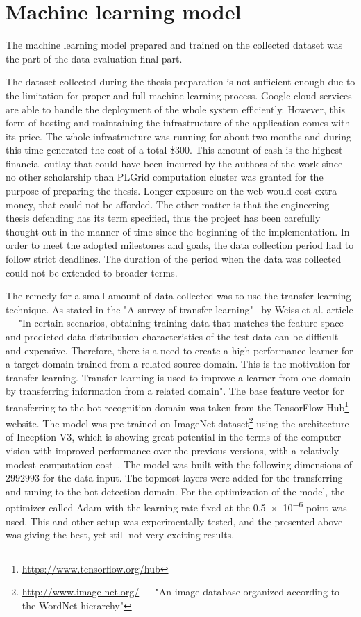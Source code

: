 \section{Machine learning model}\label{sec:machine-learning-model}
The machine learning model prepared and trained on the collected dataset was the part of the data evaluation final part.

The dataset collected during the thesis preparation is not sufficient enough due to the limitation for proper and full machine learning process.
Google cloud services are able to handle the deployment of the whole system efficiently.
However, this form of hosting and maintaining the infrastructure of the application comes with its price.
The whole infrastructure was running for about two months and during this time generated the cost of a total \$300.
This amount of cash is the highest financial outlay that could have been incurred by the authors of the work since no other scholarship than PLGrid computation cluster was granted for the purpose of preparing the thesis.
Longer exposure on the web would cost extra money, that could not be afforded.
The other matter is that the engineering thesis defending has its term specified, thus the project has been carefully thought-out in the manner of time since the beginning of the implementation.
In order to meet the adopted milestones and goals, the data collection period had to follow strict deadlines.
The duration of the period when the data was collected could not be extended to broader terms.

The remedy for a small amount of data collected was to use the transfer learning technique.
As stated in the "A survey of transfer learning"~\cite{transfer-learning-def} by Weiss et al. article --- "In certain scenarios, obtaining training data that matches the feature space and predicted data distribution characteristics of the test data can be difficult and expensive.
Therefore, there is a need to create a high-performance learner for a target domain trained from a related source domain.
This is the motivation for transfer learning.
Transfer learning is used to improve a learner from one domain by transferring information from a related domain".
The base feature vector for transferring to the bot recognition domain was taken from the TensorFlow Hub\footnote{\url{https://www.tensorflow.org/hub}} website.
The model was pre-trained on ImageNet dataset\footnote{\url{http://www.image-net.org/} --- "An image database organized according to the WordNet hierarchy"} using the architecture of Inception V3, which is showing great potential in the terms of the computer vision with improved performance over the previous versions, with a relatively modest computation cost~\cite{inception-v3}.
The model was built with the following dimensions of $299$\texttimes$299$\texttimes$3$ for the data input.
The topmost layers were added for the transferring and tuning to the bot detection domain.
For the optimization of the model, the optimizer called Adam with the learning rate fixed at the \num{0.5e-6} point was used.
This and other setup was experimentally tested, and the presented above was giving the best, yet still not very exciting results.
